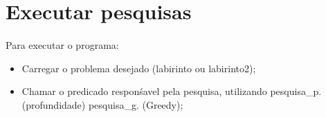 \documentclass{article}
\begin{document}
\section{Executar pesquisas}
\paragraph{} Para executar o programa:
\begin{itemize}
  \item Carregar o problema desejado (labirinto ou labirinto2);
  \item Chamar o predicado responśavel pela pesquisa, utilizando pesquisa\_p.  (profundidade) pesquisa\_g. (Greedy);
\end{itemize}
\end{document}
